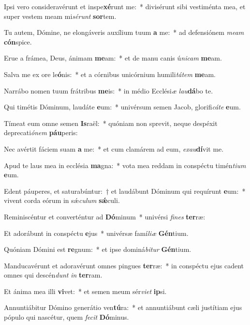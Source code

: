 \item Ipsi vero consideravérunt et inspe\textbf{xé}runt me:~* divisérunt sibi vestiménta mea, et super vestem meam mi\textit{sé}\textit{runt} \textbf{sor}tem.
\item Tu autem, Dómine, ne elongáveris auxílium tuum \textbf{a} me:~* ad defensiónem \textit{me}\textit{am} \textbf{cón}spice.
\item Erue a frámea, Deus, ánimam \textbf{me}am:~* et de manu canis ú\textit{ni}\textit{cam} \textbf{me}am.
\item Salva me ex ore le\textbf{ó}nis:~* et a córnibus unicórnium humili\textit{tá}\textit{tem} \textbf{me}am.
\item Narrábo nomen tuum frátribus \textbf{me}is:~* in médio Ecclési\textit{æ} \textit{lau}\textbf{dá}bo te.
\item Qui timétis Dóminum, laudáte \textbf{e}um:~* univérsum semen Jacob, glorifi\textit{cá}\textit{te} \textbf{e}um.
\item Tímeat eum omne semen \textbf{Is}raël:~* quóniam non sprevit, neque despéxit deprecati\textit{ó}\textit{nem} \textbf{páu}peris:
\item Nec avértit fáciem suam \textbf{a} me:~* et cum clamárem ad eum, \textit{ex}\textit{au}\textbf{dí}vit me.
\item Apud te laus mea in ecclésia \textbf{ma}gna:~* vota mea reddam in conspéctu timén\textit{ti}\textit{um} \textbf{e}um.
\item Edent páuperes, et saturabúntur:~† et laudábunt Dóminum qui requírunt \textbf{e}um:~* vivent corda eórum in sǽ\textit{cu}\textit{lum} \textbf{sǽ}culi.
\item Reminiscéntur et converténtur ad \textbf{Dó}minum~* univérsi \textit{fi}\textit{nes} \textbf{ter}ræ:
\item Et adorábunt in conspéctu \textbf{e}jus~* univérsæ famí\textit{li}\textit{æ} \textbf{Gén}tium.
\item Quóniam Dómini est \textbf{re}gnum:~* et ipse dominá\textit{bi}\textit{tur} \textbf{Gén}tium.
\item Manducavérunt et adoravérunt omnes pingues \textbf{ter}ræ:~* in conspéctu ejus cadent omnes qui descén\textit{dunt} \textit{in} \textbf{ter}ram.
\item Et ánima mea illi \textbf{vi}vet:~* et semen meum sér\textit{vi}\textit{et} \textbf{ip}si.
\item Annuntiábitur Dómino generátio ven\textbf{tú}ra:~* et annuntiábunt cæli justítiam ejus pópulo qui nascétur, quem \textit{fe}\textit{cit} \textbf{Dó}minus.
